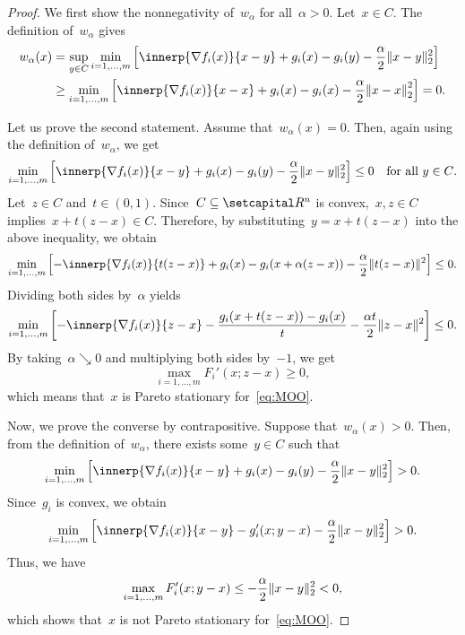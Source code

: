 \documentclass[../../main]{subfiles}
\begin{document}
\begin{proof}
    We first show the nonnegativity of~$w_\alpha$ for all~$\alpha > 0$.
    Let~$x \in C$.
    The definition of~$w_\alpha$ gives
    \begin{align}
        w_\alpha(x) &= \sup_{y \in C} \min_{i = 1, \dots, m} \left[ \innerp{\nabla f_i(x)}{x - y} + g_i(x) - g_i(y) - \frac{\alpha}{2} \norm{x - y}_2^2 \right] \\
                    &\ge \min_{i = 1, \dots, m} \left[ \innerp{\nabla f_i(x)}{x - x} + g_i(x) - g_i(x) - \frac{\alpha}{2} \norm*{x - x}_2^2 \right] = 0
                .\end{align}

                Let us prove the second statement.
                Assume that~$w_\alpha(x) = 0$.
                Then, again using the definition of~$w_\alpha$, we get
                \[
                    \min_{i = 1, \dots, m} \left[ \innerp{\nabla f_i(x)}{x - y} + g_i(x) - g_i(y) - \frac{\alpha}{2} \norm{x - y}_2^2 \right] \le 0 \forallcondition{y \in C}
                .\] 
                Let~$z \in C$ and~$t \in (0, 1)$.
                Since~$C \subseteq \setR^n$ is convex,~$x, z \in C$ implies~$x + t (z - x) \in C$.
                Therefore, by substituting~$y = x + t (z - x)$ into the above inequality, we obtain
                \[
                    \min_{i = 1, \dots, m} \left[ - \innerp{\nabla f_i(x)}{t (z - x)} + g_i(x) - g_i(x + \alpha (z - x)) - \frac{\alpha}{2} \norm{t (z - x)}^2 \right] \le 0
                .\] 
                Dividing both sides by~$\alpha$ yields
                \[
                    \min_{i = 1, \dots, m} \left[ - \innerp{\nabla f_i(x)}{z - x} - \frac{g_i(x + t (z - x)) - g_i(x)}{t} - \frac{\alpha t}{2} \norm{z - x}^2 \right] \le 0
                .\] 
                By taking~$\alpha \searrow 0$ and multiplying both sides by~$- 1$, we get
                \[
                    \max_{i = 1, \dots, m} F_i'(x; z - x) \ge 0
                ,\] 
                which means that~$x$ is Pareto stationary for~\cref{eq:MOO}.

                Now, we prove the converse by contrapositive.
                Suppose that~$w_\alpha(x) > 0$.
                Then, from the definition of~$w_\alpha$, there exists some~$y \in C$ such that
                \[
                    \min_{i = 1, \dots, m} \left[ \innerp{\nabla f_i(x)}{x - y} + g_i(x) - g_i(y) - \frac{\alpha}{2} \norm{x - y}_2^2 \right] > 0
                .\] 
                Since~$g_i$ is convex, we obtain
                \[
                    \min_{i = 1, \dots, m} \left[ \innerp{\nabla f_i(x)}{x - y} - g_i'(x; y - x) - \frac{\alpha}{2} \norm{x - y}_2^2 \right] > 0
                .\] 
                Thus, we have
                \[
                    \max_{i = 1, \dots, m} F_i'(x; y - x) \le - \frac{\alpha}{2} \lVert x - y\rVert_2^2 < 0
                ,\] 
                which shows that~$x$ is not Pareto stationary for~\cref{eq:MOO}.
            \end{proof}
\end{document}
